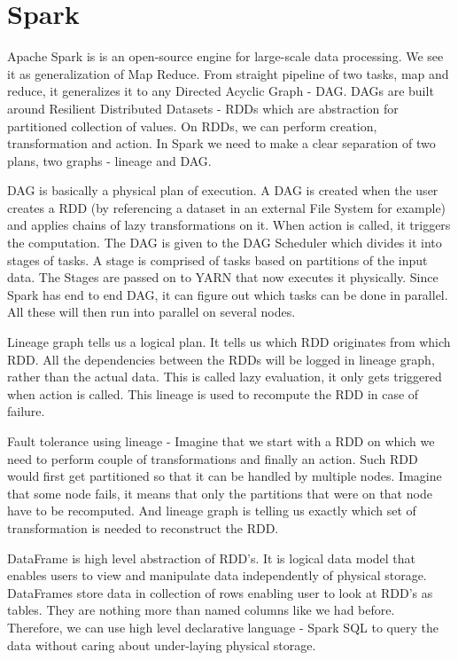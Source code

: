\section{Spark}
Apache Spark \cite{ApacheSpark} \cite{SparkDefinitiveGuide} \cite{LearningSpark} is is an open-source engine for large-scale data processing. We see it as generalization of Map Reduce. From straight pipeline of two tasks, map and reduce, it generalizes it to any Directed Acyclic Graph - DAG. DAGs are built around Resilient Distributed Datasets - RDDs \cite{RDD} which are abstraction for partitioned collection of values. On RDDs, we can perform creation, transformation and action. In Spark we need to make a clear separation of two plans, two graphs - lineage and DAG.

DAG is basically a physical plan of execution. A DAG is created when the user creates a RDD (by referencing a dataset in an external File System for example) and applies chains of lazy transformations on it. When action is called, it triggers the computation. The DAG is given to the DAG Scheduler which divides it into stages of tasks. A stage is comprised of tasks based on partitions of the input data. The Stages are passed on to YARN that now executes it physically. Since Spark has end to end DAG, it can figure out which tasks can be done in parallel. All these will then run into parallel on several nodes. 

Lineage graph tells us a logical plan. It tells us which RDD originates from which RDD. All the dependencies between the RDDs will be logged in lineage graph, rather than the actual data. This is called lazy evaluation, it only gets triggered when action is called. This lineage is used to recompute the RDD in case of failure.

Fault tolerance using lineage - Imagine that we start with a RDD on which we need to perform couple of transformations and finally an action. Such RDD would first get partitioned so that it can be handled by multiple nodes. Imagine that some node fails, it means that only the partitions that were on that node have to be recomputed. And lineage graph is telling us exactly which set of transformation is needed to reconstruct the RDD. 

DataFrame is high level abstraction of RDD's. It is logical data model that enables users to view and manipulate data independently of physical storage. DataFrames store data in collection of rows enabling user to look at RDD's as tables. They are nothing more than named columns like we had before. Therefore, we can use high level declarative language - Spark SQL to query the data without caring about under-laying physical storage.


